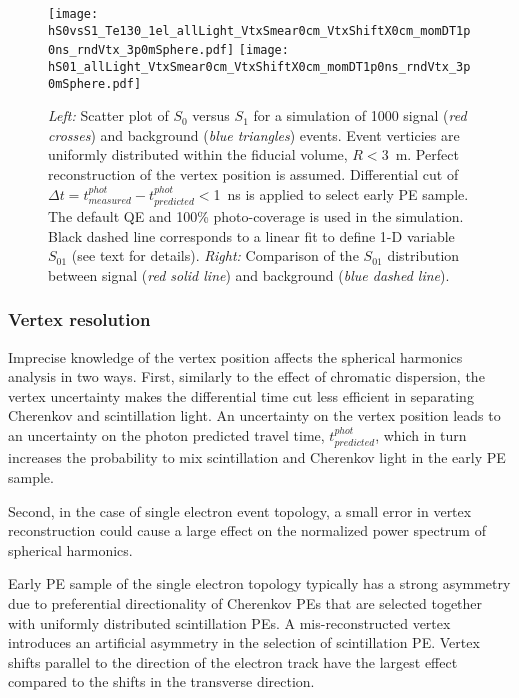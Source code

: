 \begin{figure*}[h]
  \centering
  \texttt{[image: hS0vsS1\_Te130\_1el\_allLight\_VtxSmear0cm\_VtxShiftX0cm\_momDT1p0ns\_rndVtx\_3p0mSphere.pdf]}
  \texttt{[image: hS01\_allLight\_VtxSmear0cm\_VtxShiftX0cm\_momDT1p0ns\_rndVtx\_3p0mSphere.pdf]}
  \caption{\emph{Left:} Scatter plot of $S_0$ versus $S_1$ for a simulation of 1000 signal (\emph{red crosses}) and background
    (\emph{blue triangles}) events. Event verticies are uniformly distributed within the fiducial volume, $R<3$~m.
    Perfect reconstruction of the vertex position is assumed. Differential cut of 
    $\Delta t=t^{phot}_{measured} - t^{phot}_{predicted}<$1~ns is applied to select early PE sample.
    The default QE and 100\% photo-coverage is used in the simulation.
    Black dashed line corresponds to a linear fit to define 1-D variable $S_{01}$ (see text for details).
    \emph{Right:} Comparison of the $S_{01}$ distribution between signal (\emph{red solid line}) and background (\emph{blue dashed line}).}
  \label{fig:SL_Te_SmearX0cm_momDT1ns_rndVtx_3p0m}
\end{figure*}


\subsubsection{Vertex resolution} 
Imprecise knowledge of the vertex position affects the spherical harmonics analysis in two ways. First, similarly to the effect of chromatic 
dispersion, the vertex uncertainty makes the differential time cut less efficient in separating Cherenkov and scintillation light. 
An uncertainty on the vertex position leads to an uncertainty on the photon predicted travel time, $t^{phot}_{predicted}$, which in turn
increases the probability to mix scintillation and Cherenkov light in the early PE sample.

Second, in the case of single electron event topology, a small error in vertex reconstruction could cause a large effect on the 
normalized power spectrum of spherical harmonics.

Early PE sample of the single electron topology typically has a strong asymmetry due
to preferential directionality of Cherenkov PEs that are selected together with uniformly distributed scintillation PEs. 
A mis-reconstructed vertex introduces an artificial asymmetry in the selection of scintillation PE. Vertex shifts parallel to the direction of 
the electron track have the largest effect compared to the shifts in the transverse direction. 

